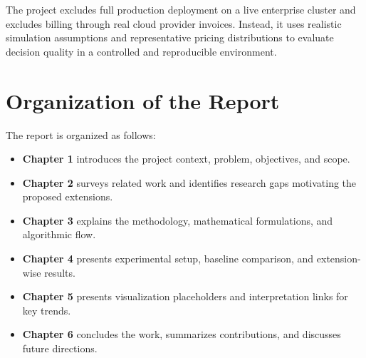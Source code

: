 The project excludes full production deployment on a live enterprise cluster and excludes billing through real cloud provider invoices. Instead, it uses realistic simulation assumptions and representative pricing distributions to evaluate decision quality in a controlled and reproducible environment.

\section{Organization of the Report}
The report is organized as follows:
\begin{itemize}
    \item \textbf{Chapter 1} introduces the project context, problem, objectives, and scope.
    \item \textbf{Chapter 2} surveys related work and identifies research gaps motivating the proposed extensions.
    \item \textbf{Chapter 3} explains the methodology, mathematical formulations, and algorithmic flow.
    \item \textbf{Chapter 4} presents experimental setup, baseline comparison, and extension-wise results.
    \item \textbf{Chapter 5} presents visualization placeholders and interpretation links for key trends.
    \item \textbf{Chapter 6} concludes the work, summarizes contributions, and discusses future directions.
\end{itemize}
